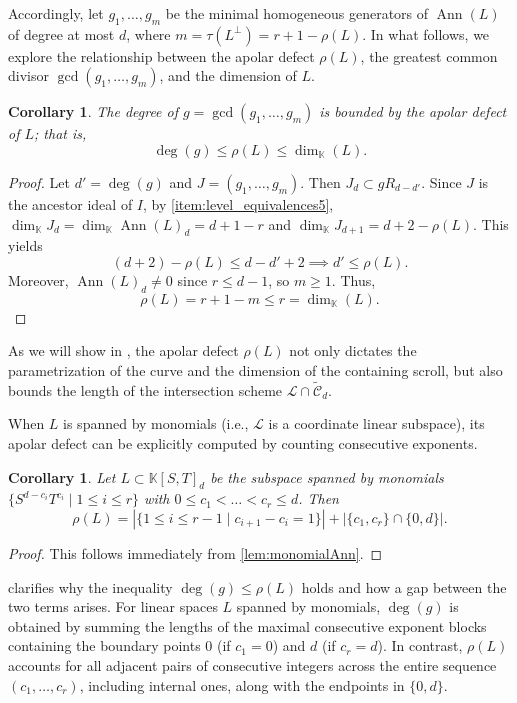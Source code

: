 \documentclass[a4paper, 11pt]{amsart}
\numberwithin{theorem}{section}
\newtheorem{corollary}[theorem]{Corollary}
\theoremstyle{definition}
\numberwithin{equation}{section}
\DeclareMathOperator{\Ann}{\operatorname{Ann}}
\begin{document}
Accordingly, let $g_1,\dots,g_m$ be the minimal homogeneous
generators of $\Ann(L)$ of degree at most $d$, where
$m=\tau(L^\perp)=r+1-\rho(L)$.
In what follows, we explore the relationship between the apolar defect $\rho(L)$, the greatest common divisor $\gcd(g_1, \dots, g_m)$, and the dimension of $L$.

\begin{corollary}\label{cor:inequalityApolarDefect}
The degree of $g=\gcd(g_1,\ldots,g_m)$ is bounded by the apolar defect of $L$; that is,
\[
\deg(g) \leq \rho(L) \leq \dim_{\mathbb{K}}(L).
\]
\end{corollary}

\begin{proof}
Let $d'=\deg(g)$ and $J=(g_1,\ldots,g_m)$.
Then $J_d\subset gR_{d-d'}$. 
Since $J$ is the ancestor ideal of $I$, by \ref{item:level_equivalences5}, $\dim_{\mathbb{K}}J_d = \dim_{\mathbb{K}} \Ann(L)_d = d+1-r$ and $\dim_{\mathbb{K}}J_{d+1}=d+2-\rho(L)$.
This yields 
\[
(d+2)-\rho(L) \leq d-d'+2 \implies d' \leq \rho(L).
\]
Moreover, $\Ann(L)_d \not= 0$ since $r \leq d - 1$, so $m\geq 1$.
Thus,
\[
\rho(L) = r+1-m \leq r = \dim_{\mathbb{K}}(L).
\]
\end{proof}

As we will show in , the apolar defect $\rho(L)$ not only dictates the parametrization of the curve and the dimension of the containing scroll, but also bounds the length of the intersection scheme $\mathcal{L} \cap \widetilde{\mathcal{C}}_d$.

When $L$ is spanned by monomials (i.e., $\mathcal{L}$ is a coordinate linear subspace), its apolar defect can be explicitly computed by counting consecutive exponents.

\begin{corollary}\label{cor:d+1gensForMonomials}
Let $L \subset \mathbb{K}[S,T]_d$ be the subspace spanned by monomials $\{S^{d-c_i}T^{c_i} \mid 1 \le i \le r\}$ with $0 \le c_1 < \dots < c_r \le d$.
Then
\[
\rho(L) = |\{ 1 \le i \le r-1 \mid c_{i+1} - c_i = 1 \}| + |\{c_1, c_r\} \cap \{0, d\}|.
\]
\end{corollary}

\begin{proof}
This follows immediately from \eqref{lem:monomialAnn}.
\end{proof}

 clarifies why the inequality $\deg(g) \le \rho(L)$ holds and how a gap between the two terms arises. For linear spaces $L$ spanned by monomials, $\deg(g)$ is obtained by summing the lengths of the maximal consecutive exponent blocks containing the boundary points $0$ (if $c_1 = 0$) and $d$ (if $c_r = d$). 
In contrast, $\rho(L)$ accounts for all adjacent pairs of consecutive integers across the entire sequence $(c_1, \dots, c_r)$, including internal ones, along with the endpoints in $\{0, d\}$.
\end{document}
